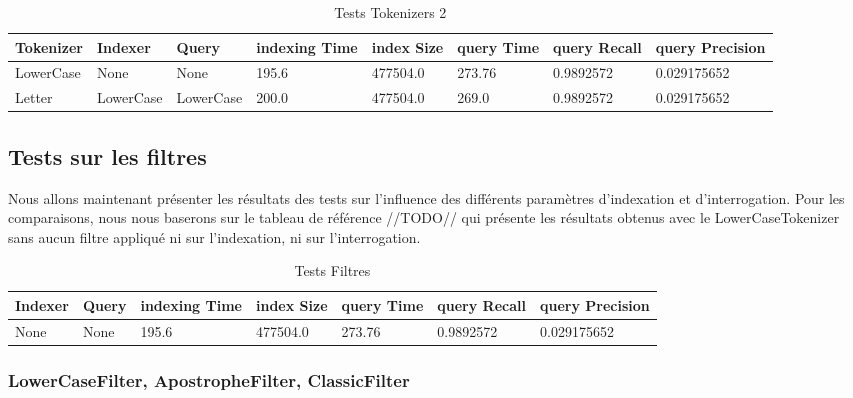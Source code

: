 \begin{table}[H]
                \centering
                \begin{tabular}{|p{1.8cm}|p{1.8cm}|p{1.8cm}|p{1.8cm}|p{1.8cm}|p{1.8cm}|p{1.8cm}|p{1.8cm}|}
                    \hline
                    \textbf{Tokenizer} & \textbf{Indexer} & \textbf{Query} & \textbf{indexing Time} & \textbf{index Size} & \textbf{query Time} & \textbf{query Recall} & \textbf{query Precision}\\
                    \hline
LowerCase & None & None & 195.6 & 477504.0 & 273.76 & 0.9892572 & 0.029175652\\
		\hline
Letter & LowerCase & LowerCase & 200.0 & 477504.0 & 269.0 & 0.9892572 & 0.029175652\\
                    \hline
                \end{tabular}
                \caption{Tests Tokenizers 2}
                \label{tab:tests_tokenizers_2}
            \end{table}

\subsection{Tests sur les filtres}

Nous allons maintenant présenter les résultats des tests sur l’influence des différents paramètres d’indexation et d’interrogation. Pour les comparaisons, nous nous baserons sur le tableau de référence //TODO// qui présente les résultats obtenus avec le LowerCaseTokenizer sans aucun filtre appliqué ni sur l’indexation, ni sur l’interrogation.

\begin{table}[H]
                \centering
                \begin{tabular}{|p{2cm}|p{2cm}|p{2cm}|p{2cm}|p{2cm}|p{2cm}|p{2cm}|}
                    \hline
                    \textbf{Indexer} & \textbf{Query} & \textbf{indexing Time} & \textbf{index Size} & \textbf{query Time} & \textbf{query Recall} & \textbf{query Precision}\\
                    \hline
None & None & 195.6 & 477504.0 & 273.76 & 0.9892572 & 0.029175652\\
                    \hline
                \end{tabular}
                \caption{Tests Filtres}
                \label{tab:tests_filtres}
            \end{table}

\subsubsection{LowerCaseFilter, ApostropheFilter, ClassicFilter}

